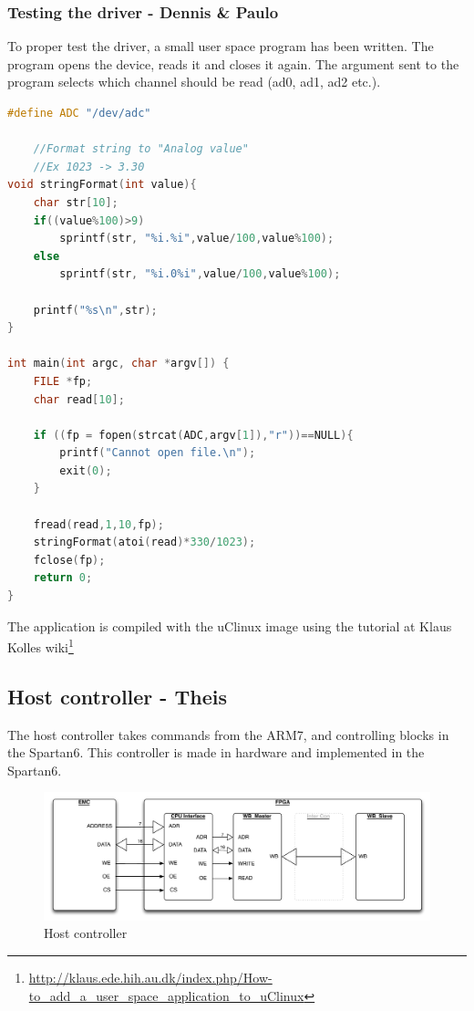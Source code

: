 \subsubsection{Testing the driver - Dennis \& Paulo}
To proper test the driver, a small user space program has been written. The program opens the device, reads it and closes it again.
The argument sent to the program selects which channel should be read (ad0, ad1, ad2 etc.).

\begin{lstlisting}[language=c]
#define ADC "/dev/adc"
	
	//Format string to "Analog value"
	//Ex 1023 -> 3.30
void stringFormat(int value){
	char str[10];
	if((value%100)>9)
		sprintf(str, "%i.%i",value/100,value%100);
 	else
 		sprintf(str, "%i.0%i",value/100,value%100);
 		
	printf("%s\n",str);
}

int main(int argc, char *argv[]) {
	FILE *fp;
	char read[10];

	if ((fp = fopen(strcat(ADC,argv[1]),"r"))==NULL){
		printf("Cannot open file.\n");
		exit(0);
	}
	
	fread(read,1,10,fp);
	stringFormat(atoi(read)*330/1023);
	fclose(fp);
	return 0;
}
\end{lstlisting}

The application is compiled with the uClinux image using the tutorial at Klaus Kolles wiki\footnote{\url{http://klaus.ede.hih.au.dk/index.php/How-to_add_a_user_space_application_to_uClinux}}

\subsection{Host controller - Theis}
The host controller takes commands from the ARM7, and controlling blocks in the Spartan6. This controller is made in hardware and implemented in the Spartan6.
\begin{figure}[H]
	\begin{centering}
		 \includegraphics[width=1.0\textwidth]{images/host_controller.pdf}
		\caption{Host controller}
	\end{centering}
\end{figure}
